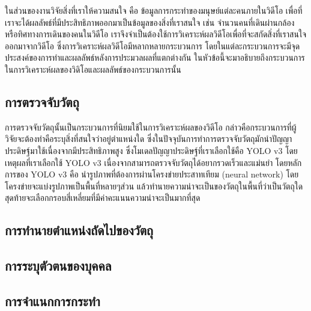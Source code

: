ในส่วนของงานวิจัยสิ่งที่เราให้ความสนใจ คือ ข้อมูลการกระทำของมนุษย์แต่ละคนภายในวิดีโอ เพื่อที่เราจะได้ผลลัพธ์ที่มีประสิทธิภาพออกมาเป็นข้อมูลของสิ่งที่เราสนใจ เช่น จำนวนคนที่เดินผ่านกล้อง 
หรือทิศทางการเดินของคนในวิดีโอ เราจึงจำเป็นต้องใช้การวิเคราะห์ผลวิดีโอเพื่อที่จะสกัดสิ่งที่เราสนใจออกมาจากวิดีโอ ซึ่งการวิเคราะห์ผลวิดีโอมีหลากหลายกระบวนการ 
โดยในแต่ละกระบวนการจะมีจุดประสงค์ของการทำและผลลัพธ์หลังการประมวลผลที่แตกต่างกัน ในหัวข้อนี้จะมาอธิบายถึงกระบวนการในการวิเคราะห์ผลของวิดิโอและผลลัพธ์ของกระบวนการนั้น

\subsection{การตรวจจับวัตถุ}
การตรวจจับวัตถุนั้นเป็นกระบวนการที่นิยมใช้ในการวิเคราะห์ผลของวิดีโอ กล่าวคือกระบวนการที่ผู้วิจัยจะต้องทำคือระบุสิ่งที่สนใจว่าอยู่ตำแหน่งใด 
ซึ่งในปัจจุบันการทำการตรวจจับวัตถุมักนำปัญญาประดิษฐ์มาใช้เนื่องจากมีประสิทธิภาพสูง ซึ่งโมเดลปัญญาประดิษฐ์ที่เราเลือกใช้คือ YOLO v3 
โดยเหตุผลที่เราเลือกใช้ YOLO v3 เนื่องจากสามารถตรวจจับวัตถุได้อยากรวดเร็วและแม่นยำ โดยหลักการของ YOLO v3 คือ นำรูปภาพที่ต้องการผ่านโครงข่ายประสาทเทียม (neural network)
โดยโครงข่ายจะแบ่งรูปภาพเป็นพื้นที่หลายๆส่วน แล้วทำนายความน่าจะเป็นของวัตถุในพื้นที่ว่าเป็นวัตถุใด สุดท้ายจะเลือกกรอบสี่เหลี่ยมที่มีค่าคะแนนความน่าจะเป็นมากที่สุด

\clearpage
\subsection{การทำนายตำแหน่งถัดไปของวัตถุ}


\subsection{การระบุตัวตนของบุคคล}


\subsection{การจำแนกการกระทำ}
